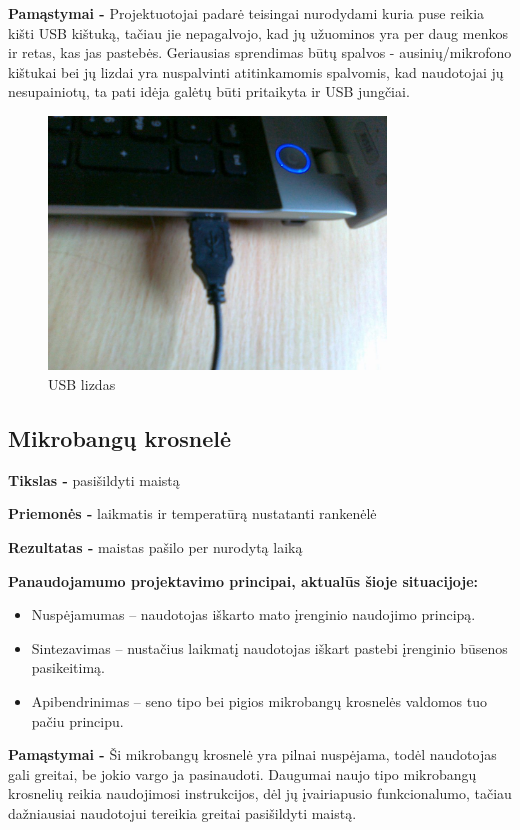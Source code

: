 ﻿\documentclass[a4paper, 12pt]{article}
\begin{document}
		\textbf{Pamąstymai -}
		Projektuotojai padarė teisingai nurodydami kuria puse reikia kišti USB kištuką, tačiau jie nepagalvojo, kad jų užuominos yra per daug menkos ir retas, kas jas pastebės. 
		Geriausias sprendimas būtų spalvos - ausinių/mikrofono kištukai bei jų lizdai yra nuspalvinti atitinkamomis spalvomis, kad naudotojai jų nesupainiotų, ta pati idėja galėtų būti pritaikyta ir USB jungčiai.
		
		\begin{figure}[h]
		\centering
		\includegraphics[width=0.8\textwidth]{images/usb.jpg}
		\caption{USB lizdas}
		\label{overflow}
		\end{figure}
	\subsection{Mikrobangų krosnelė}
		\textbf{Tikslas -}
		pasišildyti maistą

		\textbf{Priemonės -} 
		laikmatis ir temperatūrą nustatanti rankenėlė

		\textbf{Rezultatas -}
		maistas pašilo per nurodytą laiką

		\textbf{Panaudojamumo projektavimo principai, aktualūs šioje situacijoje:}
		\begin{itemize}
		\item Nuspėjamumas – naudotojas iškarto mato įrenginio naudojimo principą.	
		\item Sintezavimas – nustačius laikmatį naudotojas iškart pastebi įrenginio būsenos pasikeitimą.
		\item Apibendrinimas – seno tipo bei pigios mikrobangų krosnelės valdomos tuo pačiu principu.
		\end{itemize}

		\textbf{Pamąstymai -}
		Ši mikrobangų krosnelė yra pilnai nuspėjama, todėl naudotojas gali greitai, be jokio vargo ja pasinaudoti. 
		Daugumai naujo tipo mikrobangų krosnelių reikia naudojimosi instrukcijos, dėl jų įvairiapusio funkcionalumo, tačiau dažniausiai naudotojui tereikia greitai pasišildyti maistą.	
\end{document}
